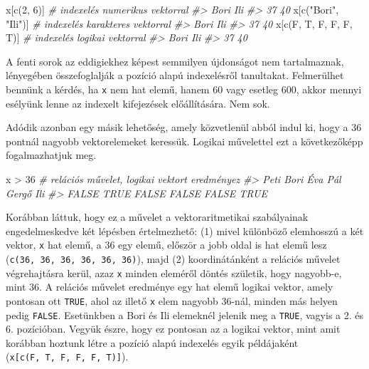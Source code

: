 \documentclass[
]{book}
\newenvironment{Shaded}{\begin{snugshade}}{\end{snugshade}}
\newcommand{\CommentTok}[1]{\textcolor[rgb]{0.56,0.35,0.01}{\textit{#1}}}
\newcommand{\DecValTok}[1]{\textcolor[rgb]{0.00,0.00,0.81}{#1}}
\newcommand{\FunctionTok}[1]{\textcolor[rgb]{0.00,0.00,0.00}{#1}}
\newcommand{\NormalTok}[1]{#1}
\newcommand{\SpecialCharTok}[1]{\textcolor[rgb]{0.00,0.00,0.00}{#1}}
\newcommand{\StringTok}[1]{\textcolor[rgb]{0.31,0.60,0.02}{#1}}
\begin{document}
\begin{Shaded}
\begin{Highlighting}[]
\NormalTok{x[}\FunctionTok{c}\NormalTok{(}\DecValTok{2}\NormalTok{, }\DecValTok{6}\NormalTok{)]               }\CommentTok{\# indexelés numerikus vektorral}
\CommentTok{\#\textgreater{} Bori  Ili }
\CommentTok{\#\textgreater{}   37   40}
\NormalTok{x[}\FunctionTok{c}\NormalTok{(}\StringTok{"Bori"}\NormalTok{, }\StringTok{"Ili"}\NormalTok{)]      }\CommentTok{\# indexelés karakteres vektorral}
\CommentTok{\#\textgreater{} Bori  Ili }
\CommentTok{\#\textgreater{}   37   40}
\NormalTok{x[}\FunctionTok{c}\NormalTok{(F, T, F, F, F, T)]   }\CommentTok{\# indexelés logikai vektorral}
\CommentTok{\#\textgreater{} Bori  Ili }
\CommentTok{\#\textgreater{}   37   40}
\end{Highlighting}
\end{Shaded}

A fenti sorok az eddigiekhez képest semmilyen újdonságot nem tartalmaznak, lényegében összefoglalják a pozíció alapú indexelésről tanultakat. Felmerülhet bennünk a kérdés, ha \texttt{x} nem hat elemű, hanem 60 vagy esetleg 600, akkor mennyi esélyünk lenne az indexelt kifejezések előállítására. Nem sok.

Adódik azonban egy másik lehetőség, amely közvetlenül abból indul ki, hogy a 36 pontnál nagyobb vektorelemeket keressük. Logikai művelettel ezt a következőképp fogalmazhatjuk meg.

\begin{Shaded}
\begin{Highlighting}[]
\NormalTok{x }\SpecialCharTok{\textgreater{}} \DecValTok{36}        \CommentTok{\# relációs művelet, logikai vektort eredményez}
\CommentTok{\#\textgreater{}  Peti  Bori   Éva   Pál Gergő   Ili }
\CommentTok{\#\textgreater{} FALSE  TRUE FALSE FALSE FALSE  TRUE}
\end{Highlighting}
\end{Shaded}

Korábban láttuk, hogy ez a művelet a vektoraritmetikai szabályainak engedelmeskedve két lépésben értelmezhető: (1) mivel különböző elemhosszú a két vektor, \texttt{x} hat elemű, a 36 egy elemű, először a jobb oldal is hat elemű lesz (\texttt{c(36,\ 36,\ 36,\ 36,\ 36,\ 36)}), majd (2) koordinátánként a relációs művelet végrehajtásra kerül, azaz \texttt{x} minden eleméről döntés születik, hogy nagyobb-e, mint 36. A relációs művelet eredménye egy hat elemű logikai vektor, amely pontosan ott \texttt{TRUE}, ahol az illető \texttt{x} elem nagyobb 36-nál, minden más helyen pedig \texttt{FALSE}. Esetünkben a Bori és Ili elemeknél jelenik meg a \texttt{TRUE}, vagyis a 2. és 6. pozícióban. Vegyük észre, hogy ez pontosan az a logikai vektor, mint amit korábban hoztunk létre a pozíció alapú indexelés egyik példájaként (\texttt{x{[}c(F,\ T,\ F,\ F,\ F,\ T){]}}).
\end{document}
